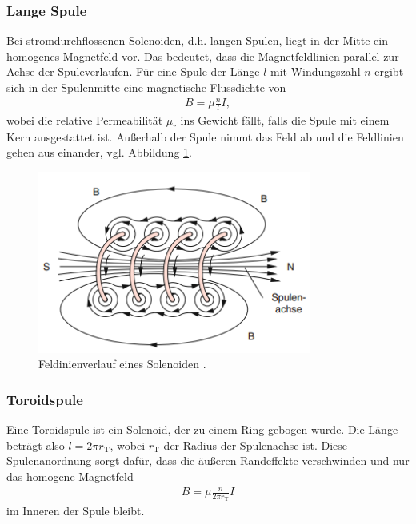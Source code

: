 \subsubsection{Lange Spule}
Bei stromdurchflossenen Solenoiden, d.h. langen Spulen, liegt in der Mitte ein homogenes Magnetfeld vor.
Das bedeutet, dass die Magnetfeldlinien parallel zur Achse der Spuleverlaufen.
Für eine Spule der Länge $l$ mit Windungszahl $n$ ergibt sich in der Spulenmitte eine magnetische Flussdichte von 
\begin{align}
    \label{eq:homogen_lange_spule}
    B = \mu \frac{n}{l} I,
\end{align}
wobei die relative Permeabilität $\mu_\text{r}$ ins Gewicht fällt, falls die Spule mit einem Kern ausgestattet ist.
Außerhalb der Spule nimmt das Feld ab und die Feldlinien gehen aus einander, vgl. Abbildung \ref{fig:solenoid}.
\begin{figure}[H]
    \centering
    \includegraphics*[height = 6cm]{./abbildungen/Solenoid.png}
    \caption[]{Feldinienverlauf eines Solenoiden \cite[S. 86]{demtroeder2}.}
    \label{fig:solenoid}
\end{figure}

\subsubsection{Toroidspule}
\label{sec:toroidspule}
Eine Toroidspule ist ein Solenoid, der zu einem Ring gebogen wurde. 
Die Länge beträgt also $l = 2 \pi r_\text{T}$, wobei $r_\text{T}$ der Radius der Spulenachse ist.
Diese Spulenanordnung sorgt dafür, dass die äußeren Randeffekte verschwinden und nur das homogene Magnetfeld
\begin{align}
    \label{eq:toroid}
    B = \mu \frac{n}{2 \pi r_\text{T}} I
\end{align}
im Inneren der Spule bleibt.

